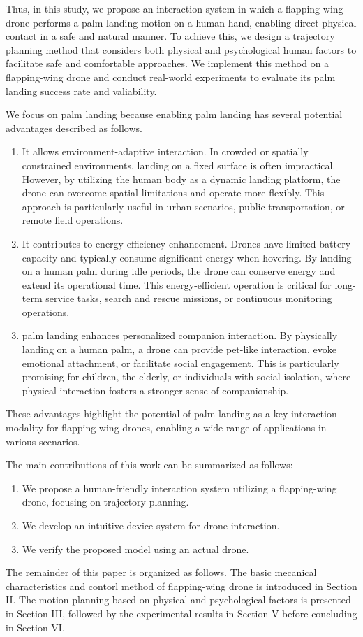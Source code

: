 Thus, in this study, we propose an interaction system in which a flapping-wing drone performs a palm landing motion on a human hand, enabling direct physical contact in a safe and natural manner.  
To achieve this, we design a trajectory planning method that considers both physical and psychological human factors to facilitate safe and comfortable approaches.  
We implement this method on a flapping-wing drone and conduct real-world experiments to evaluate its palm landing success rate and valiability.  

We focus on palm landing because enabling palm landing has several potential advantages described as follows.
\begin{enumerate}
    \item  It allows environment-adaptive interaction.  
    In crowded or spatially constrained environments, landing on a fixed surface is often impractical.  
    However, by utilizing the human body as a dynamic landing platform, the drone can overcome spatial limitations and operate more flexibly.  
    This approach is particularly useful in urban scenarios, public transportation, or remote field operations.
    \item It contributes to energy efficiency enhancement. 
    Drones have limited battery capacity and typically consume significant energy when hovering.  
    By landing on a human palm during idle periods, the drone can conserve energy and extend its operational time.  
    This energy-efficient operation is critical for long-term service tasks, search and rescue missions, or continuous monitoring operations.
    \item palm landing enhances personalized companion interaction.  
    By physically landing on a human palm, a drone can provide pet-like interaction, evoke emotional attachment, or facilitate social engagement.  
    This is particularly promising for children, the elderly, or individuals with social isolation, where physical interaction fosters a stronger sense of companionship.
\end{enumerate}
These advantages highlight the potential of palm landing as a key interaction modality for flapping-wing drones, enabling a wide range of applications in various scenarios.

The main contributions of this work can be summarized as
follows:
\begin{enumerate}
    \item We propose a human-friendly interaction system utilizing a flapping-wing drone, focusing on trajectory planning.
    \item We develop an intuitive device system for drone interaction.
    \item We verify the proposed model using an actual drone.
\end{enumerate}

The remainder of this paper is organized as follows. 
The basic mecanical characteristics and contorl method of flapping-wing drone is introduced in Section II. 
The motion planning based on physical and psychological factors is presented in Section III,
followed by the experimental results in Section V before concluding in Section VI.